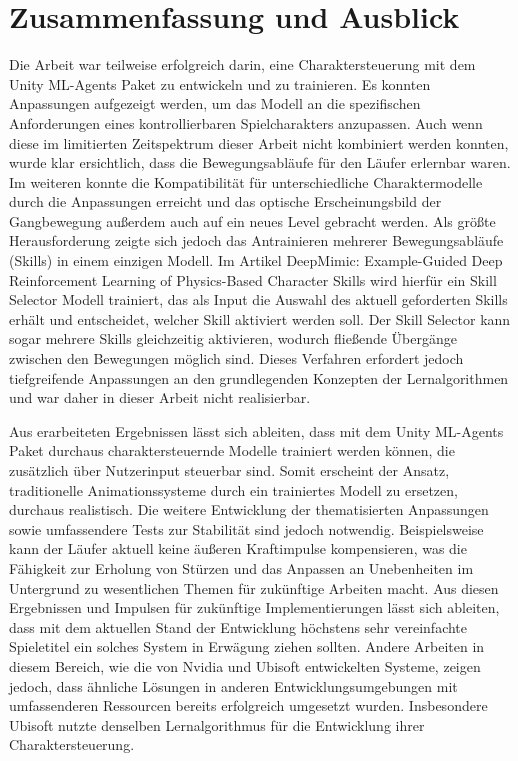 \chapter{Zusammenfassung und Ausblick}
\label{sec:zusammenfassung_ausblick}
Die Arbeit war teilweise erfolgreich darin, eine Charaktersteuerung mit dem Unity ML-Agents Paket zu entwickeln und zu trainieren. Es konnten Anpassungen aufgezeigt werden, um das Modell an die spezifischen Anforderungen eines kontrollierbaren Spielcharakters anzupassen. Auch wenn diese im limitierten Zeitspektrum dieser Arbeit nicht kombiniert werden konnten, wurde klar ersichtlich, dass die Bewegungsabläufe für den Läufer erlernbar waren. Im weiteren konnte die Kompatibilität für unterschiedliche Charaktermodelle durch die Anpassungen erreicht und das optische Erscheinungsbild der Gangbewegung außerdem auch auf ein neues Level gebracht werden. Als größte Herausforderung zeigte sich jedoch das Antrainieren mehrerer Bewegungsabläufe (Skills) in einem einzigen Modell. Im Artikel \grqq{}DeepMimic: Example-Guided Deep Reinforcement Learning of Physics-Based Character Skills\grqq{} wird hierfür ein Skill Selector Modell trainiert, das als Input die Auswahl des aktuell geforderten Skills erhält und entscheidet, welcher Skill aktiviert werden soll. Der Skill Selector kann sogar mehrere Skills gleichzeitig aktivieren, wodurch fließende Übergänge zwischen den Bewegungen möglich sind.\cite{peng2018deepmimic} Dieses Verfahren erfordert jedoch tiefgreifende Anpassungen an den grundlegenden Konzepten der Lernalgorithmen und war daher in dieser Arbeit nicht realisierbar.

Aus erarbeiteten Ergebnissen lässt sich ableiten, dass mit dem Unity ML-Agents Paket durchaus charaktersteuernde Modelle trainiert werden können, die zusätzlich über Nutzerinput steuerbar sind. Somit erscheint der Ansatz, traditionelle Animationssysteme durch ein trainiertes Modell zu ersetzen, durchaus realistisch. Die weitere Entwicklung der thematisierten Anpassungen sowie umfassendere Tests zur Stabilität sind jedoch notwendig. Beispielsweise kann der Läufer aktuell keine äußeren Kraftimpulse kompensieren, was die Fähigkeit zur Erholung von Stürzen und das Anpassen an Unebenheiten im Untergrund zu wesentlichen Themen für zukünftige Arbeiten macht. Aus diesen Ergebnissen und Impulsen für zukünftige Implementierungen lässt sich ableiten, dass mit dem aktuellen Stand der Entwicklung höchstens sehr vereinfachte Spieletitel ein solches System in Erwägung ziehen sollten. Andere Arbeiten in diesem Bereich, wie die von Nvidia und Ubisoft entwickelten Systeme, zeigen jedoch, dass ähnliche Lösungen in anderen Entwicklungsumgebungen mit umfassenderen Ressourcen bereits erfolgreich umgesetzt wurden.\cite{2022-TOG-ASE}\cite{10.1145/3355089.3356536} Insbesondere Ubisoft nutzte denselben Lernalgorithmus für die Entwicklung ihrer Charaktersteuerung.

